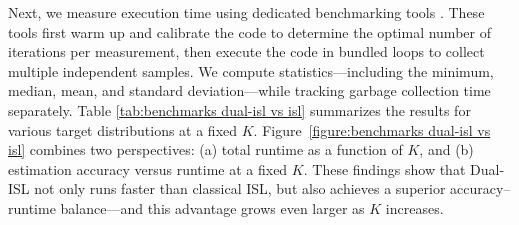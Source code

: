\documentclass{article}
\begin{document}


Next, we measure execution time using dedicated benchmarking tools \cite{chen2016robust}. These tools first warm up and calibrate the code to determine the optimal number of iterations per measurement, then execute the code in bundled loops to collect multiple independent samples. We compute statistics—including the minimum, median, mean, and standard deviation—while tracking garbage collection time separately. Table \ref{tab:benchmarks dual-isl vs isl} summarizes the results for various target distributions at a fixed \(K\). Figure~\ref{figure:benchmarks dual-isl vs isl} combines two perspectives:  
(a) total runtime as a function of \(K\), and  
(b) estimation accuracy versus runtime at a fixed \(K\).  
These findings show that Dual‐ISL not only runs faster than classical ISL, but also achieves a superior accuracy–runtime balance—and this advantage grows even larger as $K$ increases.
\end{document}
